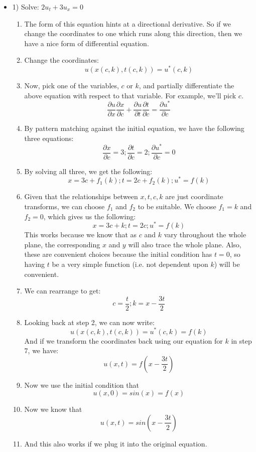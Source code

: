 \documentclass{article}
\begin{document}
\begin{itemize}
    \item 1) Solve: $2u_t + 3u_x = 0$
    \begin{enumerate}
        \item The form of this equation hints at a directional derivative. So if we change the coordinates to one which runs along this direction, then we have a nice form of differential equation.
        \item Change the coordinates:
        $$u\left(x(c,k),t(c,k)\right) = u^*(c,k)$$
        \item Now, pick one of the variables, $c$ or $k$, and partially differentiate the above equation with respect to that variable. For example, we'll pick $c$.
        $$\frac{\partial u}{\partial x} \frac{\partial x}{\partial c} + \frac{\partial u}{\partial t} \frac{\partial t}{\partial c} = \frac{\partial u^*}{\partial c}$$
        \item By pattern matching against the initial equation, we have the following three equations:
            $$\frac{\partial x}{\partial c} = 3 ; \frac{\partial t}{\partial c} = 2; \frac{\partial u^*}{\partial c} = 0$$
        \item By solving all three, we get the following:
            $$x = 3c + f_1(k) ; t = 2c + f_2(k); u^* = f(k)$$
        \item Given that the relationships between $x, t, c, k$ are just coordinate transforms, we can choose $f_1$ and $f_2$ to be suitable. We choose $f_1 = k$ and $f_2 = 0$, which gives us the following:
        $$x = 3c + k ; t = 2c; u^* = f(k)$$
        This works because we know that as $c$ and $k$ vary throughout the whole plane, the corresponding $x$ and $y$ will also trace the whole plane. Also, these are convenient choices because the initial condition has $t=0$, so having $t$ be a very simple function (i.e. not dependent upon $k$) will be convenient.
        \item We can rearrange to get:
        $$c = \frac{t}{2} ; k = x - \frac{3t}{2}$$
        \item Looking back at step 2, we can now write: 
        $$u\left(x(c,k),t(c,k)\right) = u^*(c,k) = f(k)$$
        And if we transform the coordinates back using our equation for $k$ in step 7, we have:
        $$u(x,t) = f (x-\frac{3t}{2})$$
        \item Now we use the initial condition that $$u(x,0) = sin(x) = f(x)$$
        \item Now we know that $$u(x,t) = sin(x-\frac{3t}{2})$$
        \item And this also works if we plug it into the original equation.
        


\end{enumerate}
\end{itemize}
\end{document}
